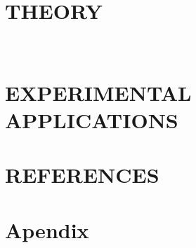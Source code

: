 \documentclass[12pt]{article}
\begin{document}
\newpage

\tableofcontents
\pagebreak
\newpage

\part{THEORY}\






\newpage
\part{EXPERIMENTAL APPLICATIONS}


\newpage
\part{REFERENCES}
\newpage
\part{Apendix}

\end{document}
